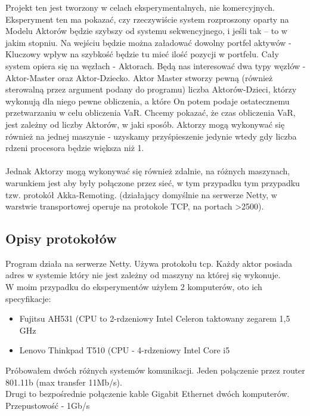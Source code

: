 \documentclass[11pt,titlepage]{article}
\numberwithin{equation}{section}
\begin{document}
Projekt ten jest tworzony w celach eksperymentalnych, nie komercyjnych. Eksperyment ten ma pokazać, czy rzeczywiście system rozproszony oparty na Modelu Aktorów będzie szybszy od systemu sekwencyjnego, i jeśli tak – to w jakim stopniu. Na wejściu będzie można załadować dowolny portfel aktywów - Kluczowy wpływ na szybkość będzie tu mieć ilość pozycji w portfelu. Cały system opiera się na węzłach - Aktorach. Będą nas interesować dwa typy węzłów - Aktor-Master oraz Aktor-Dziecko. Aktor Master stworzy pewną (również sterowalną przez argument podany do programu) liczba Aktorów-Dzieci, którzy wykonują dla niego pewne obliczenia, a które On potem podaje ostatecznemu przetwarzaniu w celu obliczenia VaR. Chcemy pokazać, że czas obliczenia VaR, jest zależny od liczby Aktorów, w jaki sposób. Aktorzy mogą wykonywać się również na jednej maszynie - uzyskamy przyśpieszenie jedynie wtedy gdy liczba rdzeni procesora będzie większa niż 1.\\
\\
Jednak Aktorzy mogą wykonywać się również zdalnie, na różnych maszynach, warunkiem jest aby były połączone przez sieć, w tym przypadku tym przypadku tzw. protokół Akka-Remoting. (działający domyślnie na serwerze Netty, w warstwie transportowej operuje na protokole TCP, na portach >2500).



\subsection{Opisy protokołów}

Program działa na serwerze Netty. Używa protokołu tcp. Każdy aktor posiada adres w systemie który nie jest zależny od maszyny na której się wykonuje. 
\\
W moim przypadku do eksperymentów użyłem 2 komputerów, oto ich specyfikacje:
\begin{itemize}
  \item Fujitsu AH531 (CPU to 2-rdzeniowy Intel Celeron taktowany zegarem 1,5 GHz
	\item Lenovo Thinkpad  T510 (CPU - 4-rdzeniowy Intel Core i5

\end{itemize}

Próbowałem dwóch różnych systemów komunikacji. Jeden połączenie przez router 801.11b (max transfer 11Mb/s).
\\
Drugi to bezpośrednie połączenie kable Gigabit Ethernet dwóch komputerów. Przepustowość - 1Gb/s
\\
\end{document}
